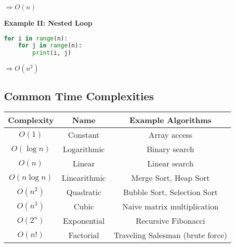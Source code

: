\(\Rightarrow O(n)\)

\textbf{Example II: Nested Loop}

\begin{lstlisting}[language=Python]
for i in range(n):
    for j in range(n):
        print(i, j)
\end{lstlisting}

\(\Rightarrow O(n^2)\)

\subsection{Common Time Complexities}

\begin{center}
\begin{tabular}{|c|c|c|}
\hline
\textbf{Complexity} & \textbf{Name} & \textbf{Example Algorithms} \\
\hline
    \(O(1)\)       & Constant          & Array access \\
    \(O(\log n)\)  & Logarithmic       & Binary search \\
    \(O(n)\)       & Linear            & Linear search \\
    \(O(n \log n)\)& Linearithmic      & Merge Sort, Heap Sort \\
    \(O(n^2)\)     & Quadratic         & Bubble Sort, Selection Sort \\
    \(O(n^3)\)     & Cubic             & Naive matrix multiplication \\
    \(O(2^n)\)     & Exponential       & Recursive Fibonacci \\
    \(O(n!)\)      & Factorial         & Traveling Salesman (brute force) \\
    \hline
\end{tabular}
\end{center}
